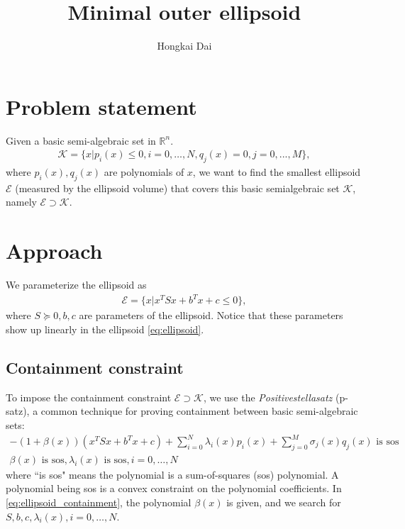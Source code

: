 \documentclass{article}
\title{Minimal outer ellipsoid}
\author{Hongkai Dai}
\date{}
\begin{document}
\maketitle
\section{Problem statement}
Given a basic semi-algebraic set in $\mathbb{R}^n$.
\begin{align}
	\mathcal{K} = \{x | p_i(x) \le 0, i=0,\hdots, N, q_j(x) = 0, j=0,...,M\},
\end{align}
where $p_i(x), q_j(x)$ are polynomials of $x$, we want to find the smallest ellipsoid $\mathcal{E}$ (measured by the ellipsoid volume) that covers this basic semialgebraic set $\mathcal{K}$, namely $\mathcal{E}\supset\mathcal{K}$.

\section{Approach}
We parameterize the ellipsoid as
\begin{align}
	\mathcal{E} = \{x | x^TSx+b^Tx+c\le 0\} \label{eq:ellipsoid},
\end{align}
where $S\succeq 0, b, c$ are parameters of the ellipsoid. Notice that these parameters show up linearly in the ellipsoid \eqref{eq:ellipsoid}.

\subsection{Containment constraint}
To impose the containment constraint $\mathcal{E}\supset\mathcal{K}$, we use the \textit{Positivestellasatz} (p-satz), a common technique for proving containment between basic semi-algebraic sets:
\begin{subequations}
\begin{align}
	-(1+\beta(x))(x^TSx + b^Tx + c) + \sum_{i=0}^N \lambda_i(x) p_i(x) + \sum_{j=0}^M \sigma_j(x)q_j(x) \text{ is sos}\\
	\beta(x) \text{ is sos}, \lambda_i(x) \text{ is sos}, i=0,\hdots, N
\end{align}
	\label{eq:ellipsoid_containment}
\end{subequations}
where ``is sos" means the polynomial is a sum-of-squares (sos) polynomial. A polynomial being sos is a convex constraint on the polynomial coefficients. In \eqref{eq:ellipsoid_containment}, the polynomial $\beta(x)$ is given, and we search for $S, b, c, \lambda_i(x), i=0,\hdots, N$.
\end{document}
